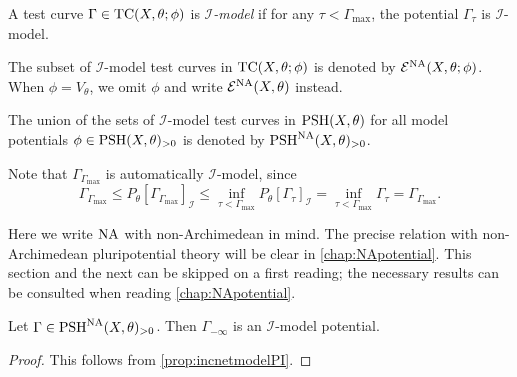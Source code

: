 \begin{definition}\label{def:Imodeltestcur}
    A test curve $\Gamma\in \mathrm{TC}(X,\theta;\phi)$ is \emph{$\mathcal{I}$-model} if for any $\tau<\Gamma_{\max}$, the potential $\Gamma_{\tau}$ is $\mathcal{I}$-model.

    The subset of $\mathcal{I}$-model test curves in $\mathrm{TC}(X,\theta;\phi)$ is denoted by $\mathcal{E}^{\mathrm{NA}}(X,\theta;\phi)$. When $\phi=V_{\theta}$, we omit $\phi$ and write $\mathcal{E}^{\mathrm{NA}}(X,\theta)$ instead.

    The union of the sets of $\mathcal{I}$-model test curves in $\mathrm{PSH}(X,\theta)$ for all model potentials $\phi\in \mathrm{PSH}(X,\theta)_{>0}$ is denoted by $\mathrm{PSH}^{\mathrm{NA}}(X,\theta)_{>0}$.
\end{definition}
Note that $\Gamma_{\Gamma_{\max}}$ is automatically $\mathcal{I}$-model, since
\[
    \Gamma_{\Gamma_{\max}}\leq P_{\theta}\left[\Gamma_{\Gamma_{\max}}\right]_{\mathcal{I}}\leq \inf_{\tau<\Gamma_{\max}}P_{\theta}\left[\Gamma_{\tau}\right]_{\mathcal{I}}=\inf_{\tau<\Gamma_{\max}}\Gamma_{\tau}=\Gamma_{\Gamma_{\max}}.
\]

Here we write $\mathrm{NA}$ with non-Archimedean in mind. The precise relation with non-Archimedean pluripotential theory will be clear in \cref{chap:NApotential}.
This section and the next can be skipped on a first reading; the necessary results can be consulted when reading \cref{chap:NApotential}.


\begin{proposition}\label{prop:GammaminfImodel}
    Let $\Gamma\in \mathrm{PSH}^{\mathrm{NA}}(X,\theta)_{>0}$. Then $\Gamma_{-\infty}$ is an $\mathcal{I}$-model potential.
\end{proposition}
\begin{proof}
    This follows from \cref{prop:incnetmodelPI}.
\end{proof}



